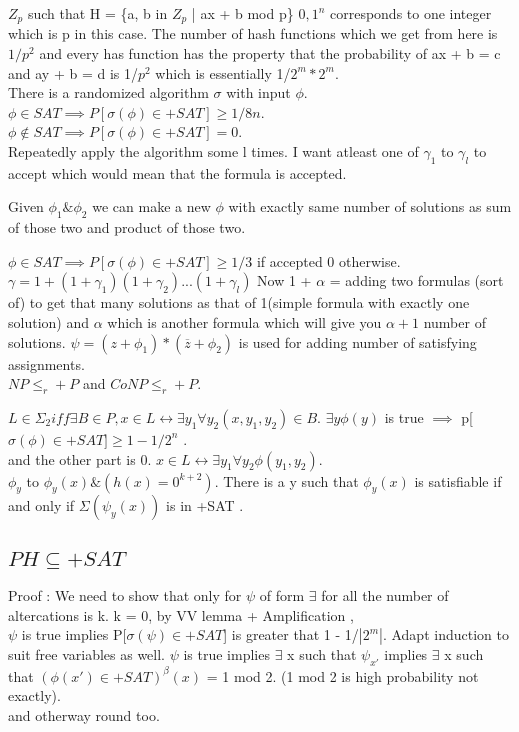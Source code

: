\documentclass[solution,addpoints,12pt]{exam}
\begin{document}
$Z_p$ such that H = \{a, b in $Z_p$ | ax + b mod p\}
${0, 1}^n$ corresponds to one integer which is p in this case.
The number of hash functions which we get from here is $1/p^2$
and every has function has the property that the probability
of ax + b = c and ay + b = d is 1/$p^2$ which is essentially 1/$2^m*2^m$.\\

There is a randomized algorithm $\sigma$ with input $\phi$.
$\phi \in SAT \implies P[\sigma(\phi) \in +SAT] \ge 1/8n$.\\
$\phi \not \in SAT \implies P[\sigma(\phi) \in +SAT] = 0$.\\
Repeatedly apply the algorithm some l times.
I want atleast one of $\gamma_1$ to $\gamma_l$ to accept which would mean that
the formula is accepted.

Given $\phi_1 \& \phi_2$ we can make a new $\phi$ with exactly
same number of solutions as sum of those two and product of those two.

$\phi \in SAT \implies P[\sigma(\phi) \in +SAT] \ge 1/3$ if accepted 0
otherwise.\\
$\gamma = 1 + (1 + \gamma_1)(1 + \gamma_2) ... (1 + \gamma_l)$
Now 1 + $\alpha$ = adding two formulas (sort of) to get that many
solutions as that of 1(simple formula with exactly one solution) and
$\alpha$ which is another formula which will give you $\alpha + 1$ number
of solutions.
$\psi = (z + \phi_1)*(\overline{z} + \phi_2)$ is used for
adding number of satisfying assignments.\\
$NP \le_r +P$ and $CoNP \le_r +P$.

$L \in \Sigma_2 iff \exists B \in P, x \in L \leftrightarrow
\exists y_1 \forall y_2 (x, y_1, y_2) \in B$.
$\exists y \phi(y)$ is true $\implies$
p[$\sigma(\phi) \in +SAT] \ge 1 - 1/2^n$
.\\ and the other part is 0.
$x \in L \leftrightarrow \exists y_1 \forall y_2 \phi(y_1, y_2)$.\\

$\phi_y$ to $\phi_y(x)\&(h(x) = 0^{k+2})$. There is a
y such that $\phi_y(x)$ is satisfiable if and only if
$\Sigma(\psi_y(x))$ is in +SAT .
\subsection{$PH \subseteq +SAT$}
Proof : We need to show that only for $\psi$ of form $\exists$
for all the number of altercations is k.
k = 0, by VV lemma + Amplification ,\\
$\psi$ is true  implies P[$\sigma(\psi) \in +SAT$] is greater that
1 - 1/$|2^m|$.
Adapt induction to suit free variables as well.
$\psi$ is true implies $\exists$ x such that $\psi_{x'}$ implies
$\exists$ x such that $(\phi(x') \in +SAT)^\beta(x)$ = 1 mod 2.
(1 mod 2 is high probability not exactly).\\
and otherway round too.
\end{document}
